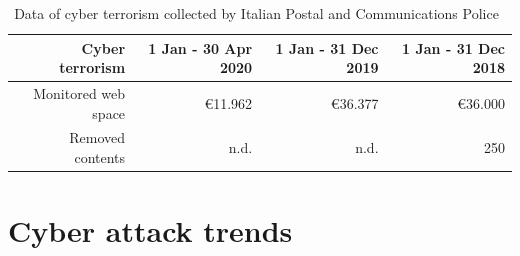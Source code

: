 \documentclass{easychair}
\begin{document}
\begin{table}[h]
  \begin{center}
	\begin{tabular}{|r|r|r|r|}									
		\hline									
		Cyber terrorism	&	1 Jan - 30 Apr 2020	&	1 Jan - 31 Dec 2019	&	1 Jan - 31 Dec 2018\\
		\hline									
		Monitored web space	&	\euro 11.962	&	\euro 36.377	&	\euro 36.000\\
		Removed contents 	&	n.d.	&	n.d.	&	250\\
		\hline	
	\end{tabular}
        \end{center}
	\caption{Data of cyber terrorism collected by Italian Postal and Communications Police~\cite{oad20}}									
	\label{tab:table3}									
\end{table}	

\section{Cyber attack trends}\label{sec:TypeAttacks}
\end{document}
